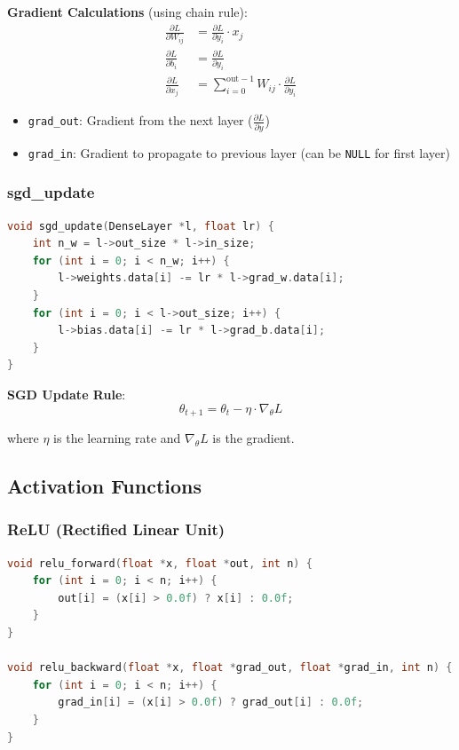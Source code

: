 \documentclass[11pt,a4paper]{article}
\begin{document}
\textbf{Gradient Calculations} (using chain rule):
\begin{align}
\frac{\partial L}{\partial W_{ij}} &= \frac{\partial L}{\partial y_i} \cdot x_j \\
\frac{\partial L}{\partial b_i} &= \frac{\partial L}{\partial y_i} \\
\frac{\partial L}{\partial x_j} &= \sum_{i=0}^{\text{out}-1} W_{ij} \cdot \frac{\partial L}{\partial y_i}
\end{align}

\begin{itemize}
    \item \texttt{grad\_out}: Gradient from the next layer ($\frac{\partial L}{\partial y}$)
    \item \texttt{grad\_in}: Gradient to propagate to previous layer (can be \texttt{NULL} for first layer)
\end{itemize}

\subsubsection{sgd\_update}

\begin{lstlisting}[language=C, caption={SGD weight update}]
void sgd_update(DenseLayer *l, float lr) {
    int n_w = l->out_size * l->in_size;
    for (int i = 0; i < n_w; i++) {
        l->weights.data[i] -= lr * l->grad_w.data[i];
    }
    for (int i = 0; i < l->out_size; i++) {
        l->bias.data[i] -= lr * l->grad_b.data[i];
    }
}
\end{lstlisting}

\textbf{SGD Update Rule}:
\begin{equation}
\theta_{t+1} = \theta_t - \eta \cdot \nabla_\theta L
\end{equation}

where $\eta$ is the learning rate and $\nabla_\theta L$ is the gradient.

\subsection{Activation Functions}

\subsubsection{ReLU (Rectified Linear Unit)}

\begin{lstlisting}[language=C, caption={ReLU activation}]
void relu_forward(float *x, float *out, int n) {
    for (int i = 0; i < n; i++) {
        out[i] = (x[i] > 0.0f) ? x[i] : 0.0f;
    }
}

void relu_backward(float *x, float *grad_out, float *grad_in, int n) {
    for (int i = 0; i < n; i++) {
        grad_in[i] = (x[i] > 0.0f) ? grad_out[i] : 0.0f;
    }
}
\end{lstlisting}
\end{document}

